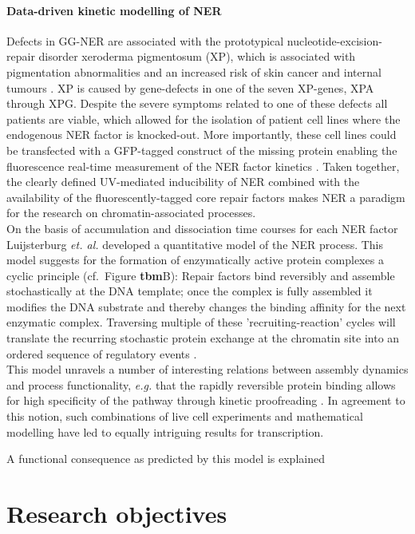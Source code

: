 \paragraph{Data-driven kinetic modelling of NER}
Defects in GG-NER are associated with the prototypical nucleotide-excision-repair disorder xeroderma pigmentosum (XP), which is associated with pigmentation abnormalities and an increased risk of skin cancer and internal tumours \cite{Hoeijmakers2009}. XP is caused by gene-defects in one of the seven XP-genes, XPA through XPG. Despite the severe symptoms related to one of these defects all patients are viable, which allowed for the isolation of patient cell lines where the endogenous NER factor is knocked-out. More importantly, these cell lines could be transfected with a GFP-tagged construct of the missing protein enabling the fluorescence real-time measurement of the NER factor kinetics \cite{Hoogstraten2002,Hoogstraten2008,Zotter2006,Rademakers2003}. Taken together, the clearly defined UV-mediated inducibility of NER combined with the availability of the fluorescently-tagged core repair factors makes NER a paradigm for the research on chromatin-associated processes.\\
On the basis of accumulation and dissociation time courses for each NER factor Luijsterburg \textit{et. al.}\cite{Luijsterburg2010} developed a quantitative model of the NER process. This model suggests for the formation of enzymatically active protein complexes a cyclic principle (cf.\ Figure \textbf{tbm}B): Repair factors bind reversibly and assemble stochastically at the DNA template; once the complex is fully assembled it modifies the DNA substrate and thereby changes the binding affinity for the next enzymatic complex. Traversing multiple of these 'recruiting-reaction' cycles will translate the recurring stochastic protein exchange at the chromatin site into an ordered sequence of regulatory events \cite{Dinant:2009:J-Cell-Biol:19332890}.\\
This model unravels a number of interesting relations between assembly dynamics and process functionality, \textit{e.g.} that the rapidly reversible protein binding allows for high specificity of the pathway through kinetic proofreading \cite{Luijsterburg2010}. In agreement to this notion, such combinations of live cell experiments and mathematical modelling have led to equally intriguing results for transcription.      

A functional consequence as predicted by this model is explained   

\section{Research objectives}

